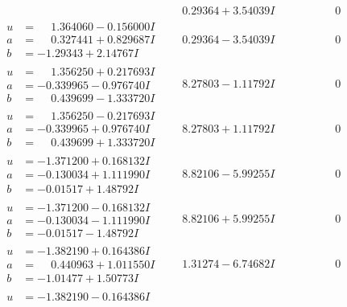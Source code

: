 \documentclass[1p]{elsarticle_modified}
\theoremstyle{definition}
\begin{document}
$$\begin{array}{c|c|c}
 & \phantom{-}0.29364 + 3.54039 I & \phantom{-0.000000 } 0 \\ \hline\begin{aligned}
u &= \phantom{-}1.364060 - 0.156000 I \\
a &= \phantom{-}0.327441 + 0.829687 I \\
b &= -1.29343 + 2.14767 I\end{aligned}
 & \phantom{-}0.29364 - 3.54039 I & \phantom{-0.000000 } 0 \\ \hline\begin{aligned}
u &= \phantom{-}1.356250 + 0.217693 I \\
a &= -0.339965 - 0.976740 I \\
b &= \phantom{-}0.439699 - 1.333720 I\end{aligned}
 & \phantom{-}8.27803 - 1.11792 I & \phantom{-0.000000 } 0 \\ \hline\begin{aligned}
u &= \phantom{-}1.356250 - 0.217693 I \\
a &= -0.339965 + 0.976740 I \\
b &= \phantom{-}0.439699 + 1.333720 I\end{aligned}
 & \phantom{-}8.27803 + 1.11792 I & \phantom{-0.000000 } 0 \\ \hline\begin{aligned}
u &= -1.371200 + 0.168132 I \\
a &= -0.130034 + 1.111990 I \\
b &= -0.01517 + 1.48792 I\end{aligned}
 & \phantom{-}8.82106 - 5.99255 I & \phantom{-0.000000 } 0 \\ \hline\begin{aligned}
u &= -1.371200 - 0.168132 I \\
a &= -0.130034 - 1.111990 I \\
b &= -0.01517 - 1.48792 I\end{aligned}
 & \phantom{-}8.82106 + 5.99255 I & \phantom{-0.000000 } 0 \\ \hline\begin{aligned}
u &= -1.382190 + 0.164386 I \\
a &= \phantom{-}0.440963 + 1.011550 I \\
b &= -1.01477 + 1.50773 I\end{aligned}
 & \phantom{-}1.31274 - 6.74682 I & \phantom{-0.000000 } 0 \\ \hline\begin{aligned}
u &= -1.382190 - 0.164386 I \\

\end{aligned}
\end{array}$$
\end{document}
